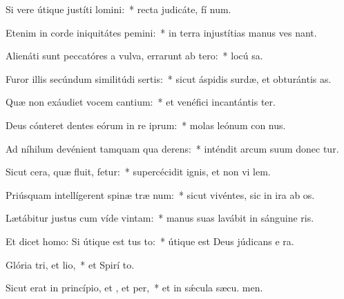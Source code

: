 \item Si vere útique justíti lomini:~* recta judicáte, fí num.
\item Etenim in corde iniquitátes pemini:~* in terra injustítias manus ves nant.
\item Alienáti sunt peccatóres a vulva, errarunt ab tero:~* locú  sa.
\item Furor illis secúndum similitúdi sertis:~* sicut áspidis surdæ, et obturántis  as.
\item Quæ non exáudiet vocem cantium:~* et venéfici incantántis ter.
\item Deus cónteret dentes eórum in re iprum:~* molas leónum con nus.
\item Ad níhilum devénient tamquam qua derens:~* inténdit arcum suum donec tur.
\item Sicut cera, quæ fluit, fetur:~* supercécidit ignis, et non vi lem.
\item Priúsquam intellígerent spinæ træ num:~* sicut vivéntes, sic in ira ab os.
\item Lætábitur justus cum víde vintam:~* manus suas lavábit in sánguine ris.
\item Et dicet homo: Si útique est tus to:~* útique est Deus júdicans e  ra.
\item Glória tri, et lio,~* et Spirí to.
\item Sicut erat in princípio, et , et per,~* et in sǽcula sæcu. men.
